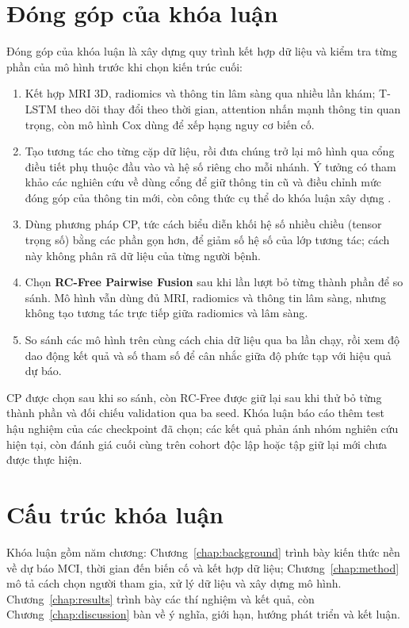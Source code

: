 \section{Đóng góp của khóa luận}
Đóng góp của khóa luận là xây dựng quy trình kết hợp dữ liệu và kiểm tra từng phần của mô hình trước khi chọn kiến trúc cuối:
\begin{enumerate}
  \item Kết hợp MRI 3D, radiomics và thông tin lâm sàng qua nhiều lần khám; T-LSTM theo dõi thay đổi theo thời gian, attention nhấn mạnh thông tin quan trọng, còn mô hình Cox dùng để xếp hạng nguy cơ biến cố.
  \item Tạo tương tác cho từng cặp dữ liệu, rồi đưa chúng trở lại mô hình qua cổng điều tiết phụ thuộc đầu vào và hệ số riêng cho mỗi nhánh. Ý tưởng có tham khảo các nghiên cứu về dùng cổng để giữ thông tin cũ và điều chỉnh mức đóng góp của thông tin mới, còn công thức cụ thể do khóa luận xây dựng \cite{ryumina2026residual,liu2026motion}.
  \item Dùng phương pháp CP, tức cách biểu diễn khối hệ số nhiều chiều (tensor trọng số) bằng các phần gọn hơn, để giảm số hệ số của lớp tương tác; cách này không phân rã dữ liệu của từng người bệnh.
  \item Chọn \textbf{RC-Free Pairwise Fusion} sau khi lần lượt bỏ từng thành phần để so sánh. Mô hình vẫn dùng đủ MRI, radiomics và thông tin lâm sàng, nhưng không tạo tương tác trực tiếp giữa radiomics và lâm sàng.
  \item So sánh các mô hình trên cùng cách chia dữ liệu qua ba lần chạy, rồi xem độ dao động kết quả và số tham số để cân nhắc giữa độ phức tạp với hiệu quả dự báo.
\end{enumerate}

CP được chọn sau khi so sánh, còn RC-Free được giữ lại sau khi thử bỏ từng thành phần và đối chiếu validation qua ba seed. Khóa luận báo cáo thêm test hậu nghiệm của các checkpoint đã chọn; các kết quả phản ánh nhóm nghiên cứu hiện tại, còn đánh giá cuối cùng trên cohort độc lập hoặc tập giữ lại mới chưa được thực hiện.

\section{Cấu trúc khóa luận}
Khóa luận gồm năm chương: Chương~\ref{chap:background} trình bày kiến thức nền về dự báo MCI, thời gian đến biến cố và kết hợp dữ liệu; Chương~\ref{chap:method} mô tả cách chọn người tham gia, xử lý dữ liệu và xây dựng mô hình. Chương~\ref{chap:results} trình bày các thí nghiệm và kết quả, còn Chương~\ref{chap:discussion} bàn về ý nghĩa, giới hạn, hướng phát triển và kết luận.

